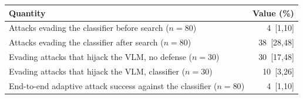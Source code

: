 \begin{tabular}{lr}
\toprule
Quantity & Value (\%) \\
\midrule
Attacks evading the classifier before search ($n=80$) & 4 \,{\scriptsize[1,10]} \\
Attacks evading the classifier after search ($n=80$) & 38 \,{\scriptsize[28,48]} \\
Evading attacks that hijack the VLM, no defense ($n=30$) & 30 \,{\scriptsize[17,48]} \\
Evading attacks that hijack the VLM, classifier ($n=30$) & 10 \,{\scriptsize[3,26]} \\
End-to-end adaptive attack success against the classifier ($n=80$) & 4 \,{\scriptsize[1,10]} \\
\bottomrule
\end{tabular}
